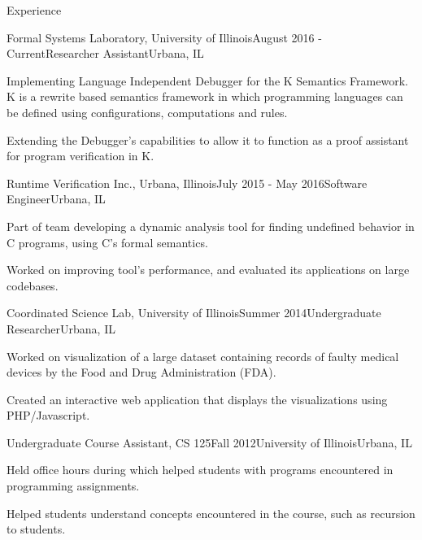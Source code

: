\documentclass{resume} %
\begin{document}
\begin{rSection}{Experience}

\begin{rSubsection}{Formal Systems Laboratory, University of Illinois}{August 2016 - Current}{Researcher Assistant}{Urbana, IL}
    \item Implementing Language Independent Debugger for the K Semantics Framework. K is a rewrite based
        semantics framework in which programming languages can be defined using configurations, computations and rules.
     \item Extending the Debugger's capabilities to allow it to function as a proof assistant for program verification in K.
\end{rSubsection}
\begin{rSubsection}{Runtime Verification Inc., Urbana, Illinois}{July 2015 - May 2016}{Software Engineer}{Urbana, IL}
    \item Part of team developing a dynamic analysis tool for finding undefined behavior in C programs, using C's formal semantics.
    \item Worked on improving tool's performance, and evaluated its applications on large codebases.
\end{rSubsection}
\begin{rSubsection}{Coordinated Science Lab, University of Illinois}{Summer 2014}{Undergraduate Researcher}{Urbana, IL}
    \item Worked on visualization of a large dataset containing records of faulty medical devices by the Food and Drug Administration (FDA).
    \item Created an interactive web application that displays the visualizations using PHP/Javascript.
\end{rSubsection}
\begin{rSubsection}{Undergraduate Course Assistant, CS 125}{Fall 2012}{University of Illinois}{Urbana, IL}
    \item Held office hours during which helped students with programs encountered in programming assignments.
    \item Helped students understand concepts encountered in the course, such as recursion to students.
\end{rSubsection}
\end{rSection}
\end{document}
